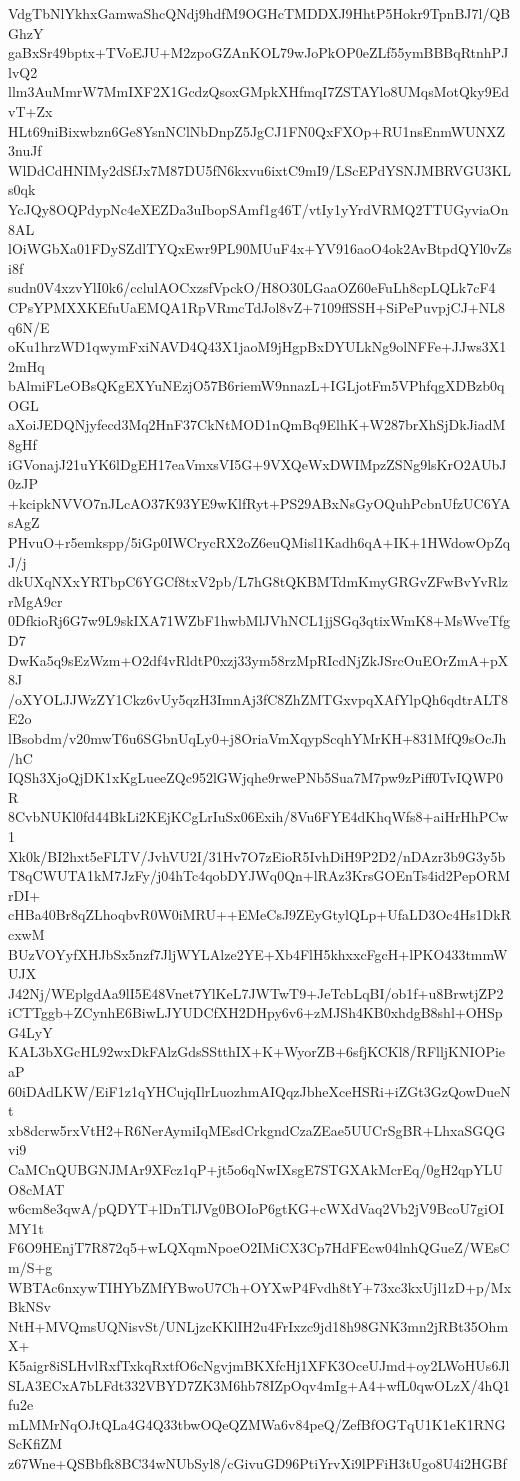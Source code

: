 VdgTbNlYkhxGamwaShcQNdj9hdfM9OGHcTMDDXJ9HhtP5Hokr9TpnBJ7l/QBGhzY
gaBxSr49bptx+TVoEJU+M2zpoGZAnKOL79wJoPkOP0eZLf55ymBBBqRtnhPJlvQ2
llm3AuMmrW7MmIXF2X1GcdzQsoxGMpkXHfmqI7ZSTAYlo8UMqsMotQky9EdvT+Zx
HLt69niBixwbzn6Ge8YsnNClNbDnpZ5JgCJ1FN0QxFXOp+RU1nsEnmWUNXZ3nuJf
WlDdCdHNIMy2dSfJx7M87DU5fN6kxvu6ixtC9mI9/LScEPdYSNJMBRVGU3KLs0qk
YcJQy8OQPdypNc4eXEZDa3uIbopSAmf1g46T/vtIy1yYrdVRMQ2TTUGyviaOn8AL
lOiWGbXa01FDySZdlTYQxEwr9PL90MUuF4x+YV916aoO4ok2AvBtpdQYl0vZsi8f
sudn0V4xzvYlI0k6/cclulAOCxzsfVpckO/H8O30LGaaOZ60eFuLh8cpLQLk7cF4
CPsYPMXXKEfuUaEMQA1RpVRmcTdJol8vZ+7109ffSSH+SiPePuvpjCJ+NL8q6N/E
oKu1hrzWD1qwymFxiNAVD4Q43X1jaoM9jHgpBxDYULkNg9olNFFe+JJws3X12mHq
bAlmiFLeOBsQKgEXYuNEzjO57B6riemW9nnazL+IGLjotFm5VPhfqgXDBzb0qOGL
aXoiJEDQNjyfecd3Mq2HnF37CkNtMOD1nQmBq9ElhK+W287brXhSjDkJiadM8gHf
iGVonajJ21uYK6lDgEH17eaVmxsVI5G+9VXQeWxDWIMpzZSNg9lsKrO2AUbJ0zJP
+kcipkNVVO7nJLcAO37K93YE9wKlfRyt+PS29ABxNsGyOQuhPcbnUfzUC6YAsAgZ
PHvuO+r5emkspp/5iGp0IWCrycRX2oZ6euQMisl1Kadh6qA+IK+1HWdowOpZqJ/j
dkUXqNXxYRTbpC6YGCf8txV2pb/L7hG8tQKBMTdmKmyGRGvZFwBvYvRlzrMgA9cr
0DfkioRj6G7w9L9skIXA71WZbF1hwbMlJVhNCL1jjSGq3qtixWmK8+MsWveTfgD7
DwKa5q9sEzWzm+O2df4vRldtP0xzj33ym58rzMpRIcdNjZkJSrcOuEOrZmA+pX8J
/oXYOLJJWzZY1Ckz6vUy5qzH3ImnAj3fC8ZhZMTGxvpqXAfYlpQh6qdtrALT8E2o
lBsobdm/v20mwT6u6SGbnUqLy0+j8OriaVmXqypScqhYMrKH+831MfQ9sOcJh/hC
IQSh3XjoQjDK1xKgLueeZQc952lGWjqhe9rwePNb5Sua7M7pw9zPiff0TvIQWP0R
8CvbNUKl0fd44BkLi2KEjKCgLrIuSx06Exih/8Vu6FYE4dKhqWfs8+aiHrHhPCw1
Xk0k/BI2hxt5eFLTV/JvhVU2I/31Hv7O7zEioR5IvhDiH9P2D2/nDAzr3b9G3y5b
T8qCWUTA1kM7JzFy/j04hTc4qobDYJWq0Qn+lRAz3KrsGOEnTs4id2PepORMrDI+
cHBa40Br8qZLhoqbvR0W0iMRU++EMeCsJ9ZEyGtylQLp+UfaLD3Oc4Hs1DkRcxwM
BUzVOYyfXHJbSx5nzf7JljWYLAlze2YE+Xb4FlH5khxxcFgcH+lPKO433tmmWUJX
J42Nj/WEplgdAa9lI5E48Vnet7YlKeL7JWTwT9+JeTcbLqBI/ob1f+u8BrwtjZP2
iCTTggb+ZCynhE6BiwLJYUDCfXH2DHpy6v6+zMJSh4KB0xhdgB8shl+OHSpG4LyY
KAL3bXGcHL92wxDkFAlzGdsSStthIX+K+WyorZB+6sfjKCKl8/RFlljKNIOPieaP
60iDAdLKW/EiF1z1qYHCujqIlrLuozhmAIQqzJbheXceHSRi+iZGt3GzQowDueNt
xb8dcrw5rxVtH2+R6NerAymiIqMEsdCrkgndCzaZEae5UUCrSgBR+LhxaSGQGvi9
CaMCnQUBGNJMAr9XFcz1qP+jt5o6qNwIXsgE7STGXAkMcrEq/0gH2qpYLUO8cMAT
w6cm8e3qwA/pQDYT+lDnTlJVg0BOIoP6gtKG+cWXdVaq2Vb2jV9BcoU7giOIMY1t
F6O9HEnjT7R872q5+wLQXqmNpoeO2IMiCX3Cp7HdFEcw04lnhQGueZ/WEsCm/S+g
WBTAc6nxywTIHYbZMfYBwoU7Ch+OYXwP4Fvdh8tY+73xc3kxUjl1zD+p/MxBkNSv
NtH+MVQmsUQNisvSt/UNLjzcKKlIH2u4FrIxzc9jd18h98GNK3mn2jRBt35OhmX+
K5aigr8iSLHvlRxfTxkqRxtfO6cNgvjmBKXfcHj1XFK3OceUJmd+oy2LWoHUs6Jl
SLA3ECxA7bLFdt332VBYD7ZK3M6hb78IZpOqv4mIg+A4+wfL0qwOLzX/4hQ1fu2e
mLMMrNqOJtQLa4G4Q33tbwOQeQZMWa6v84peQ/ZefBfOGTqU1K1eK1RNGScKfiZM
z67Wne+QSBbfk8BC34wNUbSyl8/cGivuGD96PtiYrvXi9lPFiH3tUgo8U4i2HGBf
